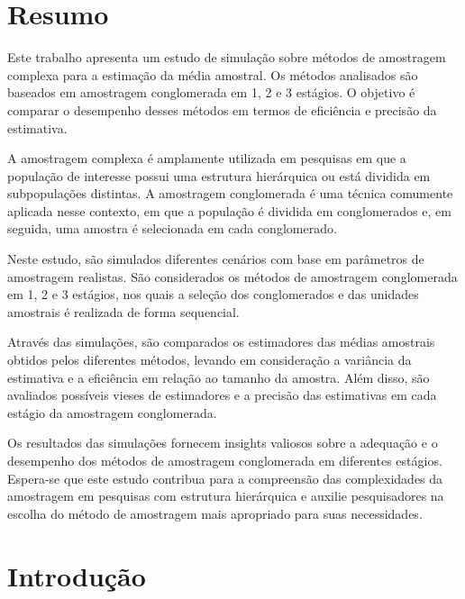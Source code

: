 \documentclass[sn-basic,pdflatex]{sn-jnl}
\theoremstyle{remark}
\theoremstyle{definition}
\begin{document}



\maketitle

\newpage

\hypertarget{resumo}{%
\section{Resumo}\label{resumo}}

Este trabalho apresenta um estudo de simulação sobre métodos de
amostragem complexa para a estimação da média amostral. Os métodos
analisados são baseados em amostragem conglomerada em 1, 2 e 3 estágios.
O objetivo é comparar o desempenho desses métodos em termos de
eficiência e precisão da estimativa.

A amostragem complexa é amplamente utilizada em pesquisas em que a
população de interesse possui uma estrutura hierárquica ou está dividida
em subpopulações distintas. A amostragem conglomerada é uma técnica
comumente aplicada nesse contexto, em que a população é dividida em
conglomerados e, em seguida, uma amostra é selecionada em cada
conglomerado.

Neste estudo, são simulados diferentes cenários com base em parâmetros
de amostragem realistas. São considerados os métodos de amostragem
conglomerada em 1, 2 e 3 estágios, nos quais a seleção dos conglomerados
e das unidades amostrais é realizada de forma sequencial.

Através das simulações, são comparados os estimadores das médias
amostrais obtidos pelos diferentes métodos, levando em consideração a
variância da estimativa e a eficiência em relação ao tamanho da amostra.
Além disso, são avaliados possíveis vieses de estimadores e a precisão
das estimativas em cada estágio da amostragem conglomerada.

Os resultados das simulações fornecem insights valiosos sobre a
adequação e o desempenho dos métodos de amostragem conglomerada em
diferentes estágios. Espera-se que este estudo contribua para a
compreensão das complexidades da amostragem em pesquisas com estrutura
hierárquica e auxilie pesquisadores na escolha do método de amostragem
mais apropriado para suas necessidades.

\hypertarget{introduuxe7uxe3o}{%
\section{Introdução}\label{introduuxe7uxe3o}}
\end{document}
